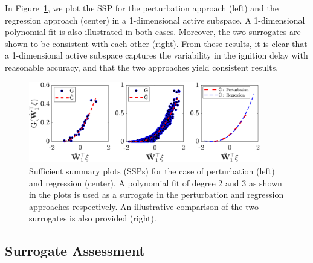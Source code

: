 In Figure~\ref{fig:hd}, we plot the SSP for the perturbation approach (left) and the regression
approach (center) in a 1-dimensional active subspace. A 1-dimensional polynomial fit is also
illustrated in both cases. Moreover, the two surrogates are shown to be consistent with each other (right).
From these results, it is clear that a 1-dimensional active subspace captures the variability in the
ignition delay with reasonable accuracy, and that the two approaches yield consistent results.
%
\begin{figure}[htbp]
 \begin{center}
   \includegraphics[width=0.9\textwidth]{./Figures/SSP_plot36Dp2}
\caption{Sufficient summary plots (SSPs) for the case of perturbation (left) and regression (center).
A polynomial fit of degree 2 and 3 as shown in the plots is used as a surrogate in the 
perturbation and regression approaches respectively. An illustrative comparison of the two
surrogates is also provided (right).}
\label{fig:hd}
\end{center}
\end{figure}
%

\subsection{Surrogate Assessment}
\label{sub:verify}

